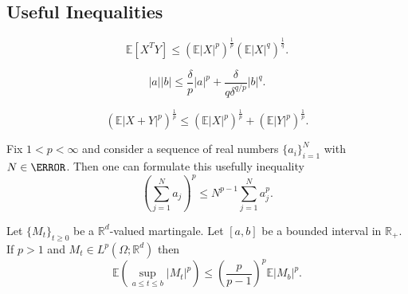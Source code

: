 \documentclass[sort&compress, preprint]{elsarticle}
\theoremstyle{definition}
\theoremstyle{plain}%
\newtheorem{thm}{Theorem}[section]
\theoremstyle{remark}
\newcommand{\m}[1]{\mathbb{E}#1}
\begin{document}
	\begin{appendices}
		\section{Useful Inequalities}
		\begin{Holder}
	\begin{equation}\label{eqn:HolderInequality}
	\m[X^T Y] \leq
	\left(
	\m|X|^p
	\right)^{\frac{1}{p}}		
	\left(
	\m|X|^q
	\right)^{\frac{1}{q}}.
	\end{equation}
\end{Holder}

\begin{Young}
	\begin{equation}\label{eqn:YoungsInequality}
	|a||b| 
	\leq
	\frac{\delta}{p} |a|^p
	+\frac{\delta}{q \delta^{q/p}} |b|^q.
	\end{equation}
\end{Young}
%
\begin{Minkowski}
	\begin{equation}
	\left(
	\m |X+Y|^p
	\right)^{\frac{1}{p}}
	\leq
	\left(
	\m |X|^p
	\right)^{\frac{1}{p}}
	+
	\left(
	\m |Y|^p
	\right)^{\frac{1}{p}}.
	\end{equation}
\end{Minkowski}
%
%
\begin{Standard}
		Fix $1<p<\infty$ and consider a sequence of real numbers $\{a_i\}_{i=1}^{N}$  with $N \in \N$. Then one can 
	formulate this usefully inequality
	\begin{equation}\label{eqn:SingleHolder}
	\left(
	\sum_{j=1}^N a_j
	\right)^p
	\leq
	N^{p-1}
	\sum_{j=1}^{N}
	a_j^p.
	\end{equation}
\end{Standard}
%
\begin{Doobs}
	Let $\{M_t\}_{t\geq 0}$ be a $\mathbb{R}^d$-valued martingale. Let $[a,b]$ be a bounded interval in $
	\mathbb{R}_{+}$.
	If $p>1$ and $M_t\in L^p(\Omega;\mathbb{R}^d)$ then
	\begin{equation}
	\label{eqn:DoobMartingaleInequality}
	\m\left( \sup_{a\leq t \leq b} |M_t|^p\right) 
	\leq \left(\frac{p}{p-1}\right)^p \m|M_b|^p. 
	\end{equation}
\end{Doobs}


\end{appendices}
\end{document}
